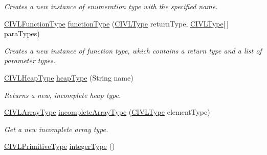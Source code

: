 \begin{DoxyCompactItemize}
\begin{DoxyCompactList}\small\item\em Creates a new instance of enumeration type with the specified name. \end{DoxyCompactList}\item 
\hyperlink{interfaceedu_1_1udel_1_1cis_1_1vsl_1_1civl_1_1model_1_1IF_1_1type_1_1CIVLFunctionType}{C\+I\+V\+L\+Function\+Type} \hyperlink{interfaceedu_1_1udel_1_1cis_1_1vsl_1_1civl_1_1model_1_1IF_1_1CIVLTypeFactory_a7ab8d627c813f263703db4f709ebcf81}{function\+Type} (\hyperlink{interfaceedu_1_1udel_1_1cis_1_1vsl_1_1civl_1_1model_1_1IF_1_1type_1_1CIVLType}{C\+I\+V\+L\+Type} return\+Type, \hyperlink{interfaceedu_1_1udel_1_1cis_1_1vsl_1_1civl_1_1model_1_1IF_1_1type_1_1CIVLType}{C\+I\+V\+L\+Type}\mbox{[}$\,$\mbox{]} para\+Types)
\begin{DoxyCompactList}\small\item\em Creates a new instance of function type, which contains a return type and a list of parameter types. \end{DoxyCompactList}\item 
\hyperlink{interfaceedu_1_1udel_1_1cis_1_1vsl_1_1civl_1_1model_1_1IF_1_1type_1_1CIVLHeapType}{C\+I\+V\+L\+Heap\+Type} \hyperlink{interfaceedu_1_1udel_1_1cis_1_1vsl_1_1civl_1_1model_1_1IF_1_1CIVLTypeFactory_a535ddc63fe176a188a785e3298ccb18d}{heap\+Type} (String name)
\begin{DoxyCompactList}\small\item\em Returns a new, incomplete heap type. \end{DoxyCompactList}\item 
\hyperlink{interfaceedu_1_1udel_1_1cis_1_1vsl_1_1civl_1_1model_1_1IF_1_1type_1_1CIVLArrayType}{C\+I\+V\+L\+Array\+Type} \hyperlink{interfaceedu_1_1udel_1_1cis_1_1vsl_1_1civl_1_1model_1_1IF_1_1CIVLTypeFactory_a70cbdfcbd73b2c1390cbc76b9c56649d}{incomplete\+Array\+Type} (\hyperlink{interfaceedu_1_1udel_1_1cis_1_1vsl_1_1civl_1_1model_1_1IF_1_1type_1_1CIVLType}{C\+I\+V\+L\+Type} element\+Type)
\begin{DoxyCompactList}\small\item\em Get a new incomplete array type. \end{DoxyCompactList}\item 
\hyperlink{interfaceedu_1_1udel_1_1cis_1_1vsl_1_1civl_1_1model_1_1IF_1_1type_1_1CIVLPrimitiveType}{C\+I\+V\+L\+Primitive\+Type} \hyperlink{interfaceedu_1_1udel_1_1cis_1_1vsl_1_1civl_1_1model_1_1IF_1_1CIVLTypeFactory_af0cbefdb79635c5e81c7dc3c373c0f06}{integer\+Type} ()

\end{DoxyCompactItemize}
